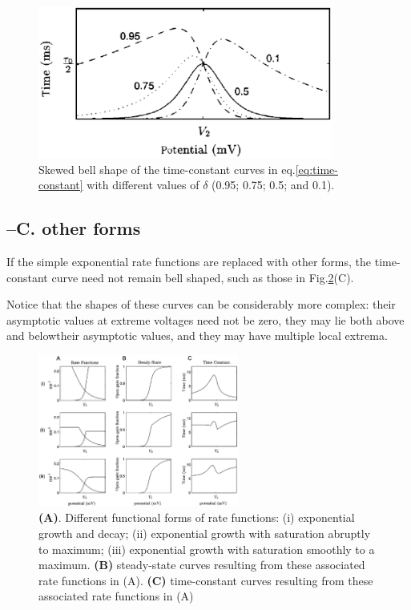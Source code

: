   \begin{figure}[htb]
    \centerline{\includegraphics[height=5cm]{./images/time-constants-skewed-bell-shape.eps}}
    \caption{Skewed bell shape of
    the time-constant curves in
    eq.\ref{eq:time-constant} with
    different values of $\delta$ (0.95; 0.75; 0.5; and 0.1).
    }\label{fig:time-constants-skewed-bell-shape}
  \end{figure}

\subsection{--C. other forms}

If the simple exponential rate functions are replaced with other forms, the
time-constant curve need not remain bell shaped, such as those in
Fig.\ref{fig:rate-functions-forms}(C).

Notice that the shapes of these curves can be considerably more complex: their
asymptotic values at extreme voltages need not be zero, they may lie both above
and belowtheir asymptotic values, and they may have multiple local extrema.


  \begin{figure}[htb]
    \centerline{\includegraphics[height=5cm]{./images/rate-functions-forms.eps}}
    \caption{{\bf (A)}. Different functional forms of rate
    functions: (i) exponential growth and
    decay; (ii) exponential growth with saturation abruptly
    to maximum; (iii) exponential growth with
    saturation smoothly to a maximum. {\bf (B)}
    steady-state curves resulting from these
    associated rate functions in (A). {\bf (C)}
    time-constant curves resulting from these
    associated rate functions in (A)}
    \label{fig:rate-functions-forms}
  \end{figure}

